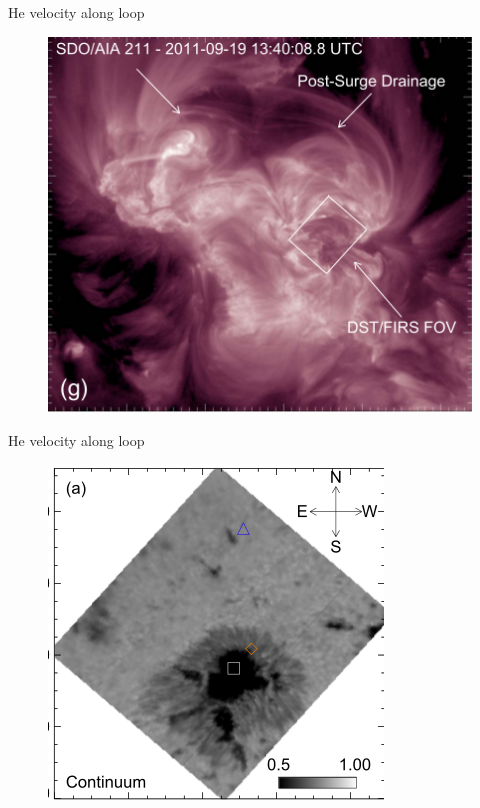 \documentclass{beamer}
\begin{document}
\begin{frame}{He velocity along loop}

 
\begin{figure}[H]
 \centering
 \includegraphics[scale=0.5]{img2.png}
\end{figure}



\end{frame}
\begin{frame}{He velocity along loop}

 
\begin{figure}[H]
 \centering
 \includegraphics[scale=0.6]{sp_cont.png}
\end{figure}



\end{frame}
\end{document}
